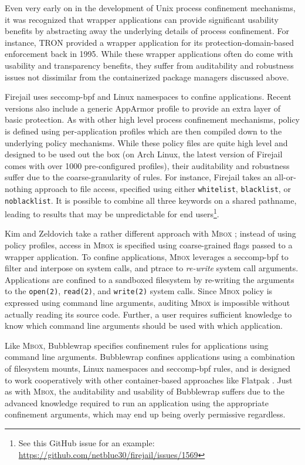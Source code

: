 \documentclass[dvipsnames, 12pt]{article}
\newcommand{\kimmbox}{\textsc{Mbox}}
\begin{document}
Even very early on in the development of Unix process confinement mechanisms, it
was recognized that wrapper applications can provide significant usability
benefits by abstracting away the underlying details of process confinement.  For
instance, TRON \cite{berman1995_tron} provided a wrapper application for its
protection-domain-based enforcement back in 1995. While these wrapper
applications often do come with usability and transparency benefits, they suffer
from auditability and robustness issues not dissimilar from the containerized
package managers discussed above.

Firejail \cite{firejail} uses seccomp-bpf and Linux namespaces to confine
applications. Recent versions also include a generic AppArmor profile to provide
an extra layer of basic protection. As with other high level process confinement
mechanisms, policy is defined using per-application profiles which are then
compiled down to the underlying policy mechanisms. While these policy files are
quite high level and designed to be used out the box (on Arch Linux, the latest
version of Firejail comes with over 1000 pre-configured profiles), their
auditability and robustness suffer due to the coarse-granularity of rules. For
instance, Firejail takes an all-or-nothing approach to file access, specified
using either \texttt{whitelist}, \texttt{blacklist}, or \texttt{noblacklist}. It
is possible to combine all three keywords on a shared pathname, leading to
results that may be unpredictable for end users\footnote{See this GitHub issue
for an example: \url{https://github.com/netblue30/firejail/issues/1569}}.

Kim and Zeldovich take a rather different approach with \kimmbox{}
\cite{kim2013_mbox}; instead of using policy profiles, access in \kimmbox{} is
specified using coarse-grained flags passed to a wrapper application. To confine
applications, \kimmbox{} leverages a seccomp-bpf to filter and interpose on
system calls, and ptrace to \textit{re-write} system call arguments.
Applications are confined to a sandboxed filesystem by re-writing the arguments
to the \texttt{open(2)}, \texttt{read(2)}, and \texttt{write(2)} system calls.
Since \kimmbox{} policy is expressed using command line arguments, auditing
\kimmbox{} is impossible without actually reading its source code. Further,
a user requires sufficient knowledge to know which command line arguments should
be used with which application.

Like \kimmbox{}, Bubblewrap \cite{bubblewrap} specifies confinement rules for
applications using command line arguments. Bubblewrap confines applications
using a combination of filesystem mounts, Linux namespaces and seccomp-bpf
rules, and is designed to work cooperatively with other container-based
approaches like Flatpak \cite{flatpak}. Just as with \kimmbox{}, the
auditability and usability of Bubblewrap suffers due to the advanced knowledge
required to run an application using the appropriate confinement arguments,
which may end up being overly permissive regardless.
\end{document}
